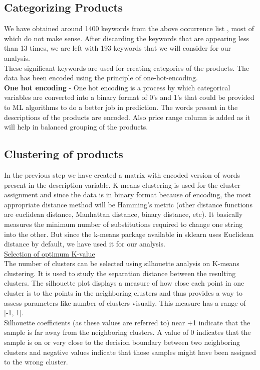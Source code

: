 \subsection{Categorizing Products}

We have obtained around 1400 keywords from the above occurrence list , most of which do not make sense. After discarding the keywords that are appearing less than 13 times, we are left with 193 keywords that we will consider for our analysis.\\

These significant keywords are used for creating categories of the products. The data has been encoded using the principle of one-hot-encoding.\\

\textbf{One hot encoding} - One hot encoding is a process by which categorical variables are converted into a binary format of 0's and 1's that could be provided to ML algorithms to do a better job in prediction. The words present in the descriptions of the products are encoded. Also price range column is added as it will help in balanced grouping of the products.\\

\subsection{Clustering of products}

In the previous step we have created a matrix with encoded version of words present in the description variable. K-means clustering is used for the cluster assignment and since the data is in binary format because of encoding, the most appropriate distance method will be Hamming's metric (other distance functions are euclidean distance, Manhattan distance, binary distance, etc). It basically measures the minimum number of substitutions required to change one string into the other. But since the k-means package available in sklearn uses Euclidean distance by default, we have used it for our analysis.\\

\underline{Selection of optimum K-value}\\

The number of clusters can be selected using silhouette analysis on K-means clustering. It is used to study the separation distance between the resulting clusters. The silhouette plot displays a measure of how close each point in one cluster is to the points in the neighboring clusters and thus provides a way to assess parameters like number of clusters visually. This measure has a range of [-1, 1].\\
Silhouette coefficients (as these values are referred to) near +1 indicate that the sample is far away from the neighboring clusters. A value of 0 indicates that the sample is on or very close to the decision boundary between two neighboring clusters and negative values indicate that those samples might have been assigned to the wrong cluster.\\

